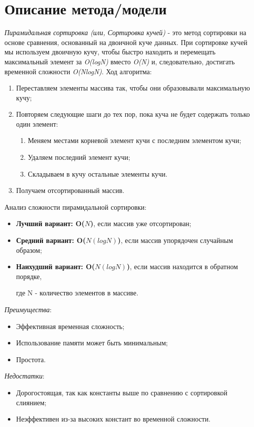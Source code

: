 \documentclass[12pt, a4paper]{report}
\begin{document}
	\section*{Описание метода/модели}
	\large
	\textit{Пирамидальная сортировка (или, Сортировка кучей)} - это метод сортировки на основе сравнения, основанный на двоичной куче данных. При сортировке кучей мы используем двоичную кучу, чтобы быстро находить и перемещать максимальный элемент за \textit{O(logN)} вместо \textit{O(N)} и, следовательно, достигать временной сложности \textit{O(NlogN)}.
	Ход алгоритма:
	\begin{enumerate}
		\item Переставляем элементы массива так, чтобы они образовывали максимальную кучу;
		\item Повторяем следующие шаги до тех пор, пока куча не будет содержать только один элемент:
		\begin{enumerate}
			\item Меняем местами корневой элемент кучи с последним элементом кучи;
			\item Удаляем последний элемент кучи;
			\item Складываем в кучу остальные элементы кучи.
		\end{enumerate}
		\item Получаем отсортированный массив.
	\end{enumerate}
	Анализ сложности пирамидальной сортировки:
	\begin{itemize}
		\item \textbf{Лучший вариант: O(\( N \))}, если массив уже отсортирован;
		\item \textbf{Средний вариант: O(\( N(logN) \))}, если массив упорядочен случайным образом;
		\item \textbf{Наихудший вариант: O(\( N(logN) \))}, если массив находится в обратном порядке, \par
		где N - количество элементов в массиве.
	\end{itemize}
	\textit{Преимущества}:
	\begin{itemize}
		\item Эффективная временная сложность;
		\item Использование памяти может быть минимальным;
		\item Простота.
	\end{itemize}
	\textit{Недостатки}:
	\begin{itemize}
		\item Дорогостоящая, так как константы выше по сравнению с сортировкой слиянием;
		\item Неэффективен из-за высоких констант во временной сложности.
	\end{itemize}
\end{document}

